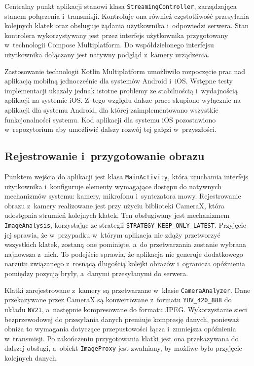 Centralny punkt aplikacji stanowi klasa \texttt{StreamingController}, zarządzająca stanem połączenia i~transmisji. Kontroluje ona również częstotliwość przesyłania kolejnych klatek oraz obsługuje żądania użytkownika i~odpowiedzi serwera. Stan kontrolera wykorzystywany jest przez interfejs użytkownika przygotowany w~technologii Compose Multiplatform. Do współdzielonego interfejsu użytkownika dołączany jest natywny podgląd z~kamery urządzenia.

Zastosowanie technologii Kotlin Multiplatform umożliwiło rozpoczęcie prac nad aplikacją mobilną jednocześnie dla systemów Android i~iOS. Wstępne testy implementacji ukazały jednak istotne problemy ze stabilnością i~wydajnością aplikacji na systemie iOS. Z~tego względu dalsze prace skupiono wyłącznie na aplikacji dla systemu Android, dla której zaimplementowano wszystkie funkcjonalności systemu. Kod aplikacji dla systemu iOS pozostawiono w~repozytorium aby umożliwić dalszy rozwój tej gałęzi w~przyszłości.

\subsection{Rejestrowanie i~przygotowanie obrazu}

Punktem wejścia do aplikacji jest klasa \texttt{MainActivity}, która uruchamia interfejs użytkownika i~konfiguruje elementy wymagające dostępu do natywnych mechanizmów systemu: kamery, mikrofonu i~syntezatora mowy. Rejestrowanie obrazu z~kamery realizowane jest przy użyciu biblioteki CameraX, która udostępnia strumień kolejnych klatek. Ten obsługiwany jest mechanizmem \texttt{ImageAnalysis}, korzystając ze strategii \texttt{STRATEGY\_KEEP\_ONLY\_LATEST}. Przyjęcie jej sprawia, że w~przypadku w~którym aplikacja nie zdąży przetworzyć wszystkich klatek, zostaną one pominięte, a~do przetwarzania zostanie wybrana najnowsza z~nich. To podejście sprawia, że aplikacja nie generuje dodatkowego narzutu związanego z~rosnącą długością kolejki obrazów i~ogranicza opóźnienia pomiędzy pozycją bryły, a~danymi przesyłanymi do serwera.

Klatki zarejestrowane z~kamery są przetwarzane w~klasie \texttt{CameraAnalyzer}. Dane przekazywane przez CameraX są konwertowane z~formatu \texttt{YUV\_420\_888} do układu \texttt{NV21}, a~następnie kompresowane do formatu JPEG. Wykorzystanie sieci bezprzewodowej do przesyłania danych premiuje kompresję danych, ponieważ obniża to wymagania dotyczące przepustowości łącza i~zmniejsza opóźnienia w~transmisji. Po zakończeniu przygotowania klatki jest ona przekazywana do dalszej obsługi, a~obiekt \texttt{ImageProxy} jest zwalniany, by możliwe było przyjęcie kolejnych danych.

